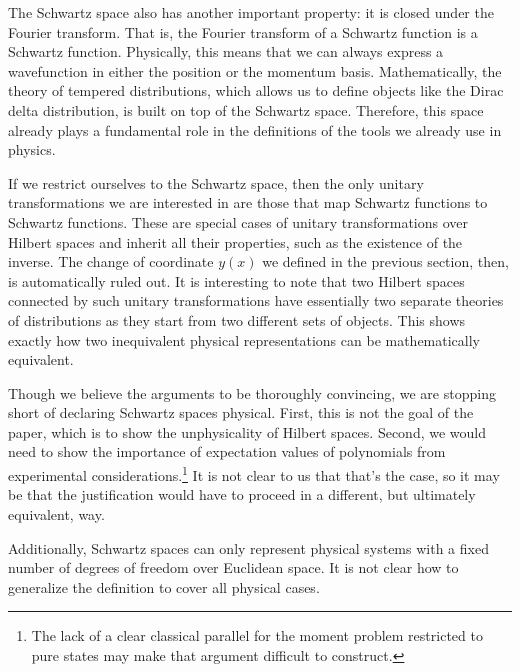 \documentclass[10pt,twocolumn, nofootinbib]{revtex4-2}
\begin{document}
The Schwartz space also has another important property: it is closed under the Fourier transform. That is, the Fourier transform of a Schwartz function is a Schwartz function. Physically, this means that we can always express a wavefunction in either the position or the momentum basis. Mathematically, the theory of tempered distributions, which allows us to define objects like the Dirac delta distribution, is built on top of the Schwartz space. Therefore, this space already plays a fundamental role in the definitions of the tools we already use in physics.

If we restrict ourselves to the Schwartz space, then the only unitary transformations we are interested in are those that map Schwartz functions to Schwartz functions. These are special cases of unitary transformations over Hilbert spaces and inherit all their properties, such as the existence of the inverse. The change of coordinate $y(x)$ we defined in the previous section, then, is automatically ruled out. It is interesting to note that two Hilbert spaces connected by such unitary transformations have essentially two separate theories of distributions as they start from two different sets of objects. This shows exactly how two inequivalent physical representations can be mathematically equivalent.

Though we believe the arguments to be thoroughly convincing, we are stopping short of declaring Schwartz spaces physical. First, this is not the goal of the paper, which is to show the unphysicality of Hilbert spaces. Second, we would need to show the importance of expectation values of polynomials from experimental considerations.\footnote{The lack of a clear classical parallel for the moment problem restricted to pure states may make that argument difficult to construct.} It is not clear to us that that's the case, so it may be that the justification would have to proceed in a different, but ultimately equivalent, way.

Additionally, Schwartz spaces can only represent physical systems with a fixed number of degrees of freedom over Euclidean space. It is not clear how to generalize the definition to cover all physical cases.
\end{document}
